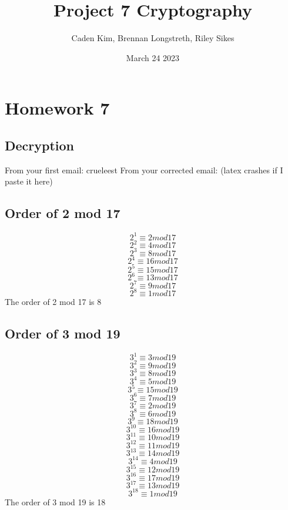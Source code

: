 \documentclass{article}
\title{Project 7 Cryptography}
\author{Caden Kim, Brennan Longstreth, Riley Sikes }
\date{March 24 2023}
\begin{document}
\maketitle

\section{Homework 7}

\subsection{Decryption}
From your first email: crueleest
From your corrected email: (latex crashes if I paste it here)
\subsection{Order of 2 mod 17}
$$2^1 \equiv 2 mod 17$$
$$2^2 \equiv 4 mod 17$$
$$2^3 \equiv 8 mod 17$$
$$2^4 \equiv 16 mod 17$$
$$2^5 \equiv 15 mod 17$$
$$2^6 \equiv 13 mod 17$$
$$2^7 \equiv 9 mod 17$$
$$2^8 \equiv 1 mod 17$$
The order of 2 mod 17 is 8

\subsection{Order of 3 mod 19}
$$3^1 \equiv 3 mod 19$$
$$3^2 \equiv 9 mod 19$$
$$3^3 \equiv 8 mod 19$$
$$3^4 \equiv 5 mod 19$$
$$3^5 \equiv 15 mod 19$$
$$3^6 \equiv 7 mod 19$$
$$3^7 \equiv 2 mod 19$$
$$3^8 \equiv 6 mod 19$$
$$3^9 \equiv 18 mod 19$$
$$3^10 \equiv 16 mod 19$$
$$3^11 \equiv 10 mod 19$$
$$3^12 \equiv 11 mod 19$$
$$3^13 \equiv 14 mod 19$$
$$3^14 \equiv 4 mod 19$$
$$3^15 \equiv 12 mod 19$$
$$3^16 \equiv 17 mod 19$$
$$3^17 \equiv 13 mod 19$$
$$3^18 \equiv 1 mod 19$$
The order of 3 mod 19 is 18
\end{document}
